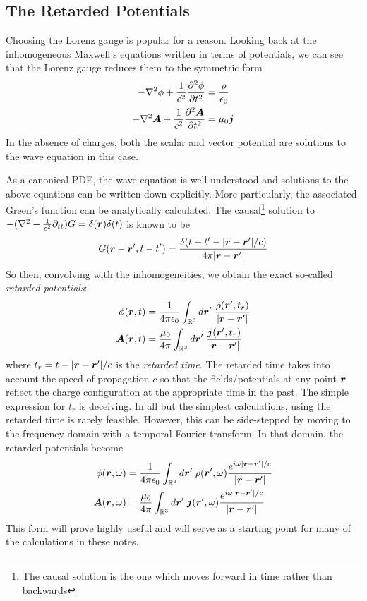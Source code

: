 \documentclass[twocolumn]{gwclass}
\newcommand{\R}{\mathbb{R}}
\begin{document}
	\subsection{The Retarded Potentials}
	Choosing the Lorenz gauge is popular for a reason. Looking back at the inhomogeneous Maxwell's equations written in terms of potentials, we can see that the Lorenz gauge reduces them to the symmetric form
	\begin{align*} 
		-\nabla^2\phi + \frac{1}{c^2}\frac{\partial^2\phi}{\partial t^2} &= \frac{\rho}{\epsilon_0} \\
		-\nabla^2\boldsymbol{A} + \frac{1}{c^2} \frac{\partial^2\boldsymbol{A}}{\partial t^2} &= \mu_0\boldsymbol{j}
	\end{align*}
	In the absence of charges, both the scalar and vector potential are solutions to the wave equation in this case.
	
	As a canonical PDE, the wave equation is well understood and solutions to the above equations can be written down explicitly. More particularly, the associated Green's function can be analytically calculated. The causal\footnote{The causal solution is the one which moves forward in time rather than backwards} solution to $-(\nabla^2 - \frac{1}{c^2}\partial_{tt})G = \delta(\boldsymbol{r})\delta(t)$ is known to be
	$$ G(\boldsymbol{r}-\boldsymbol{r}',t-t') = \frac{\delta(t-t'-|\boldsymbol{r}-\boldsymbol{r}'|/c)}{4\pi|\boldsymbol{r}-\boldsymbol{r}'|} $$
	So then, convolving with the inhomogeneities, we obtain the exact so-called \emph{retarded potentials}:
	\begin{align*}
		\phi(\*r,t) &= \frac{1}{4\pi\epsilon_0}\int_{\R^3}d\*r'\;\frac{\rho(\*r',t_r)}{|\*r-\*r'|} \\
		\*A(\*r,t) &= \frac{\mu_0}{4\pi}\int_{\R^3}d\*r'\;\frac{\*j(\*r',t_r)}{|\*r-\*r'|}
	\end{align*}
	where $t_r=t-|\boldsymbol{r}-\boldsymbol{r}'|/c$ is the \emph{retarded time}. The retarded time takes into account the speed of propagation $c$ so that the fields/potentials at any point $\boldsymbol{r}$ reflect the charge configuration at the appropriate time in the past. The simple expression for $t_r$ is deceiving. In all but the simplest calculations, using the retarded time is rarely feasible. However, this can be side-stepped by moving to the frequency domain with a temporal Fourier transform. In that domain, the retarded potentials become
	\begin{align*}
	\phi(\*r,\omega) &= \frac{1}{4\pi\epsilon_0}\int_{\R^3}d\*r'\;\rho(\*r',\omega)\frac{e^{i\omega|\*r-\*r'|/c}}{|\*r-\*r'|} \\
	\*A(\*r,\omega) &= \frac{\mu_0}{4\pi}\int_{\R^3}d\*r'\;\*j(\*r',\omega)\frac{e^{i\omega|\*r-\*r'|/c}}{|\*r-\*r'|}
	\end{align*}
	This form will prove highly useful and will serve as a starting point for many of the calculations in these notes.
	
\end{document}
